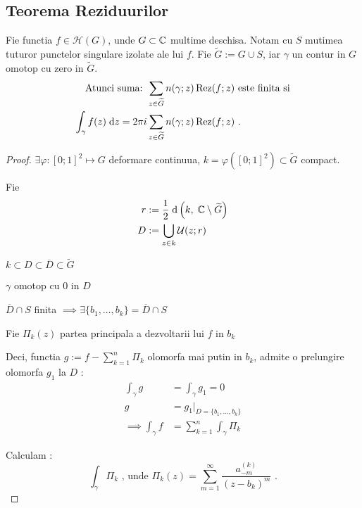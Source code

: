 \subsection{Teorema Reziduurilor}

\begin{theorem}
    Fie functia $f\in \mathcal{H}(G)$, unde $G \subset \mathbb{C}$ multime deschisa.
    Notam cu $S$  mutimea tuturor punctelor singulare izolate ale lui $f$.
    Fie $\widetilde{G}:=G \cup S $, iar $\gamma$ un contur in $G$ omotop cu zero
     in $\widetilde{G}$.
    \begin{align*}
        \text{Atunci suma: }
        &\sum_{z \in \widetilde{G}} {n(\gamma;z) \operatorname{Rez}(f;z)}
        \text{ este finita si}  \\
        \int_{\gamma} f(z) \; \mathrm{d} z = 2\pi i &\sum_{z \in \widetilde{G}} n(\gamma;z) \operatorname{Rez}(f;z) \text{ .}
    \end{align*}
    \begin{proof}
        $\exists \varphi:[0;1]^2 \mapsto G$ deformare continuua,
        $k = \varphi ([0;1]^2) \subset \widetilde{G}$ compact.

        Fie
        \begin{align*}
            r &:= \frac{1}{2} \; \mathrm{d} \left(k,\; \mathbb{C} \setminus \widetilde{G}\right)
            \\
            D &:= \bigcup_{z\in k} \mathcal{U}(z;r)
        \end{align*}

        $k \subset D \subset \overline{D} \subset \widetilde{G}$

        $\gamma$ omotop cu $0$ in $D$

        $\overline{D} \cap S$ finita
                $\implies \exists \{b_1, \dotsc, b_k \} = \overline{D} \cap S$

        Fie $\Pi_{k}(z)$ partea principala a dezvoltarii lui $f$ in $b_k$

        Deci, functia $\displaystyle g := f - \sum_{k=1}^{n} \Pi_k$
        olomorfa mai putin in $b_k$, admite o prelungire olomorfa $g_1$ la $D$ :
        \begin{align*}
            \int_{\gamma}  g &= \int_{\gamma} g_1 = 0 \\
                           g &= g_1 |_{D=\{b_1, \dotsc, b_k\}}\\
            \implies \int_{\gamma} f &= \sum_{k=1}^{n} \int_{\gamma} \Pi_k
        \end{align*}

        Calculam :
        \[
            \int_{\gamma} \Pi_k \text{ , unde }
            \Pi_k(z) = \sum_{m=1}^{\infty} \frac{a_{- m}^{(k)} }{(z - b_k)^m}  \text{ .}
        \]


\end{proof}
\end{theorem}
